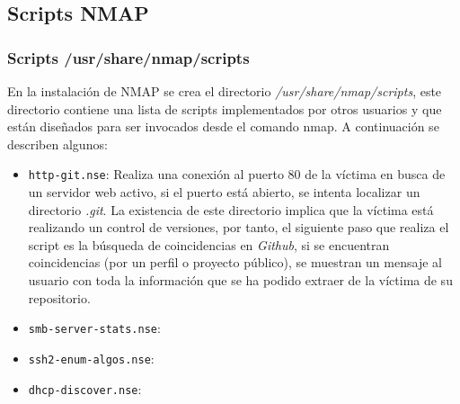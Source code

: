 \documentclass[a4,12pt,onecolum]{article}
\begin{document}
\begin{itemize}

\subsection{Scripts NMAP}
\subsubsection{Scripts /usr/share/nmap/scripts}
En la instalación de NMAP se crea el directorio \textit{/usr/share/nmap/scripts}, este directorio contiene una lista de scripts implementados por otros usuarios y que están diseñados para ser invocados desde el comando nmap. A continuación se describen algunos:
\begin{itemize}
\item \texttt{http-git.nse}: Realiza una conexión al puerto 80 de la víctima en busca de un servidor web activo, si el puerto está abierto, se intenta localizar un directorio \emph{.git}. La existencia de este directorio implica que la víctima está realizando un control de versiones, por tanto, el siguiente paso que realiza el script es la búsqueda de coincidencias en \emph{Github}, si se encuentran coincidencias (por un perfil o proyecto público), se muestran un mensaje al usuario con toda la información que se ha podido extraer de la víctima de su repositorio. 
\item \texttt{smb-server-stats.nse}: 
\item \texttt{ssh2-enum-algos.nse}:
\item \texttt{dhcp-discover.nse}:
\end{itemize}

\end{itemize}
\end{document}
